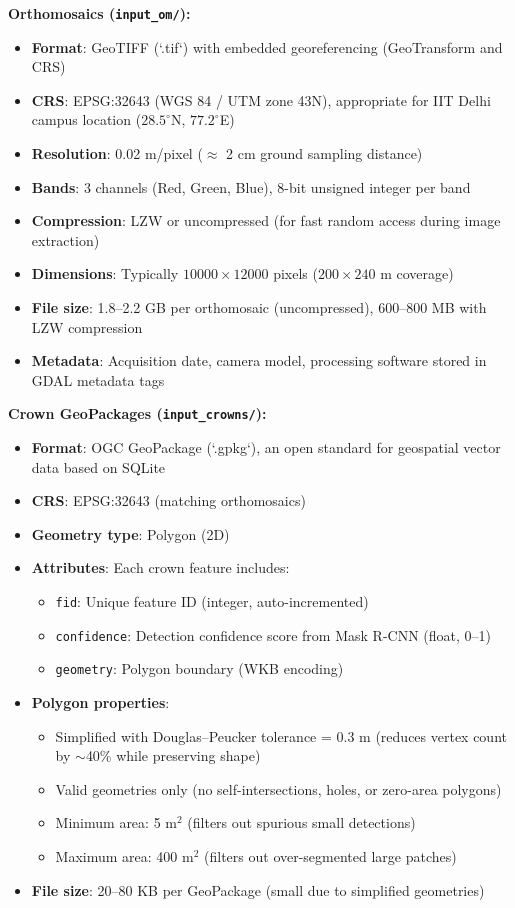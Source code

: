 \textbf{Orthomosaics (\texttt{input\_om/}):}
\begin{itemize}
    \item \textbf{Format}: GeoTIFF (`.tif`) with embedded georeferencing (GeoTransform and CRS)
    \item \textbf{CRS}: EPSG:32643 (WGS 84 / UTM zone 43N), appropriate for IIT Delhi campus location ($28.5^\circ$N, $77.2^\circ$E)
    \item \textbf{Resolution}: 0.02 m/pixel ($\approx$ 2 cm ground sampling distance)
    \item \textbf{Bands}: 3 channels (Red, Green, Blue), 8-bit unsigned integer per band
    \item \textbf{Compression}: LZW or uncompressed (for fast random access during image extraction)
    \item \textbf{Dimensions}: Typically $10000 \times 12000$ pixels ($200 \times 240$ m coverage)
    \item \textbf{File size}: 1.8--2.2 GB per orthomosaic (uncompressed), 600--800 MB with LZW compression
    \item \textbf{Metadata}: Acquisition date, camera model, processing software stored in GDAL metadata tags
\end{itemize}

\textbf{Crown GeoPackages (\texttt{input\_crowns/}):}
\begin{itemize}
    \item \textbf{Format}: OGC GeoPackage (`.gpkg`), an open standard for geospatial vector data based on SQLite
    \item \textbf{CRS}: EPSG:32643 (matching orthomosaics)
    \item \textbf{Geometry type}: Polygon (2D)
    \item \textbf{Attributes}: Each crown feature includes:
    \begin{itemize}
        \item \texttt{fid}: Unique feature ID (integer, auto-incremented)
        \item \texttt{confidence}: Detection confidence score from Mask R-CNN (float, 0--1)
        \item \texttt{geometry}: Polygon boundary (WKB encoding)
    \end{itemize}
    \item \textbf{Polygon properties}:
    \begin{itemize}
        \item Simplified with Douglas--Peucker tolerance = 0.3 m (reduces vertex count by $\sim$40\% while preserving shape)
        \item Valid geometries only (no self-intersections, holes, or zero-area polygons)
        \item Minimum area: 5 m$^2$ (filters out spurious small detections)
        \item Maximum area: 400 m$^2$ (filters out over-segmented large patches)
    \end{itemize}
    \item \textbf{File size}: 20--80 KB per GeoPackage (small due to simplified geometries)
\end{itemize}

